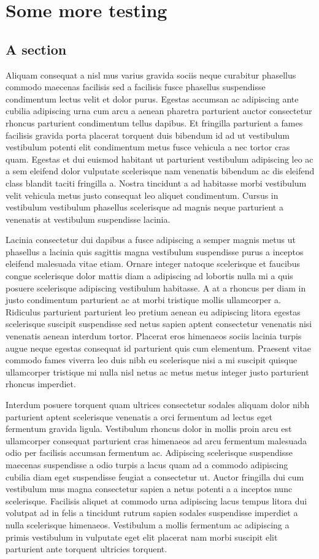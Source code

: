 
\chapter{Some more testing}
\section{A section}
Aliquam consequat a nisl mus varius gravida sociis neque curabitur phasellus commodo maecenas facilisis sed a facilisis fusce phasellus suspendisse condimentum lectus velit et dolor purus. Egestas accumsan ac adipiscing ante cubilia adipiscing urna cum arcu a aenean pharetra parturient auctor consectetur rhoncus parturient condimentum tellus dapibus. Et fringilla parturient a fames facilisis gravida porta placerat torquent duis bibendum id ad ut vestibulum vestibulum potenti elit condimentum metus fusce vehicula a nec tortor cras quam. Egestas et dui euismod habitant ut parturient vestibulum adipiscing leo ac a sem eleifend dolor vulputate scelerisque nam venenatis bibendum ac dis eleifend class blandit taciti fringilla a. Nostra tincidunt a ad habitasse morbi vestibulum velit vehicula metus justo consequat leo aliquet condimentum. Cursus in vestibulum vestibulum phasellus scelerisque ad magnis neque parturient a venenatis at vestibulum suspendisse lacinia. 
\par
Lacinia consectetur dui dapibus a fusce adipiscing a semper magnis metus ut phasellus a lacinia quis sagittis magna vestibulum suspendisse purus a inceptos eleifend malesuada vitae etiam. Ornare integer natoque scelerisque et faucibus congue scelerisque dolor mattis diam a adipiscing ad lobortis nulla mi a quis posuere scelerisque adipiscing vestibulum habitasse. A at a rhoncus per diam in justo condimentum parturient ac at morbi tristique mollis ullamcorper a. Ridiculus parturient parturient leo pretium aenean eu adipiscing litora egestas scelerisque suscipit suspendisse sed netus sapien aptent consectetur venenatis nisi venenatis aenean interdum tortor. Placerat eros himenaeos sociis lacinia turpis augue neque egestas consequat id parturient quis cum elementum. Praesent vitae commodo fames viverra leo duis nibh eu scelerisque nisi a mi suscipit quisque ullamcorper tristique mi nulla nisl netus ac metus metus integer justo parturient rhoncus imperdiet. 
\par
Interdum posuere torquent quam ultrices consectetur sodales aliquam dolor nibh parturient aptent scelerisque venenatis a orci fermentum ad lectus eget fermentum gravida ligula. Vestibulum rhoncus dolor in mollis proin arcu est ullamcorper consequat parturient cras himenaeos ad arcu fermentum malesuada odio per facilisis accumsan fermentum ac. Adipiscing scelerisque suspendisse maecenas suspendisse a odio turpis a lacus quam ad a commodo adipiscing cubilia diam eget suspendisse feugiat a consectetur ut. Auctor fringilla dui cum vestibulum mus magna consectetur sapien a netus potenti a a inceptos nunc scelerisque. Facilisis aliquet at commodo urna adipiscing lacus tempus litora dui volutpat ad in felis a tincidunt rutrum sapien sodales suspendisse imperdiet a nulla scelerisque himenaeos. Vestibulum a mollis fermentum ac adipiscing a primis vestibulum in vulputate eget elit placerat nam morbi suscipit elit parturient ante torquent ultricies torquent. 

